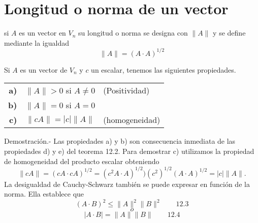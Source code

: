 \section{Longitud o norma de un vector}

\begin{tcolorbox}[colframe=white]
    \begin{def.} si $A$ es un vector en $V_n$ su longitud o norma se designa con $\|A\|$ y se define mediante la igualdad $$\|A\| = (A\cdot A)^{1/2}$$
    \end{def.}
\end{tcolorbox}

\begin{teo} Si $A$ es un vector de $V_n$ y $c$ un escalar, tenemos las siguientes propiedades.
\begin{center}
    \begin{tabular}{rcl}
	\textbf{a)}&$\|A\|>0$ si $A\neq 0$&(Positividad)\\	
	\textbf{b)}&$\|A\|=0$ si $A=0$&\\	
	\textbf{c)}&$\|cA\|=\left|c\right|\|A\|$&(homogeneidad)\\
    \end{tabular}
\end{center}

    Demostración.-\; Las propiedades a) y b) son consecuencia inmediata de las propiedades d) y e) del teorema 12.2. Para demostrar c) utilizamos la propiedad de homogeneidad del producto escalar obteniendo $$\|cA\|=(cA\cdot cA)^{1/2} = (c^2A\cdot A)^{1/2} ) (c^2)^{1/2}(A\cdot A)^{1/2} = |c|\|A\|.$$
    La desigualdad de Cauchy-Schwarz también se puede expresar en función de la norma. Ella establece que $$(A\cdot B)^2 \leq \|A\|^2 \|B\|^2\qquad \mbox{12.3}$$ $$o$$ $$|A\cdot B| = \|A\|\|B\| \qquad \mbox{12.4}$$\\\\

\end{teo}

